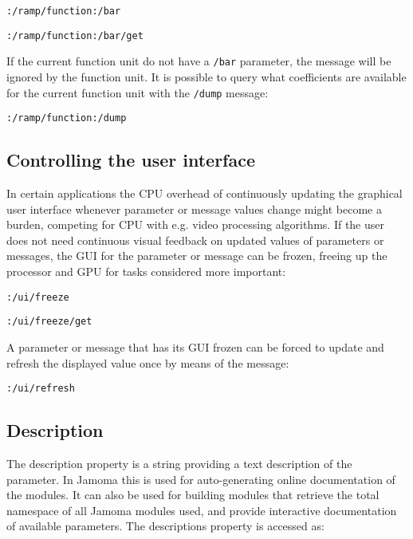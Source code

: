 \documentclass{NIME-alternate}
\begin{document}
\texttt{:/ramp/function:/bar}

\texttt{:/ramp/function:/bar/get}

If the current function unit do not have a \texttt{/bar} parameter, the message will be ignored by the function unit. It is possible to query what coefficients are available for the current function unit with the \texttt{/dump} message:

\texttt{:/ramp/function:/dump}





\subsection{Controlling the user interface} %
\label{sub:controlling_the_user_interface}

In certain applications the CPU overhead of continuously updating the graphical user interface whenever parameter or message values change might become a burden, competing for CPU with e.g. video processing algorithms. If the user does not need continuous visual feedback on updated values of parameters or messages, the GUI for the parameter or message can be frozen, freeing up the processor and GPU for tasks considered more important:

\texttt{:/ui/freeze}

\texttt{:/ui/freeze/get}

A parameter or message that has its GUI frozen can be forced to update and refresh the displayed value once by means of the message:

\texttt{:/ui/refresh}






\subsection{Description} %
\label{sub:description}

The description property is a string providing a text description of the parameter. In Jamoma this is used for auto-generating online documentation of the modules. It can also be used for building modules that retrieve the total namespace of all Jamoma modules used, and provide interactive documentation of available parameters. The descriptions property is accessed as:
\end{document}
